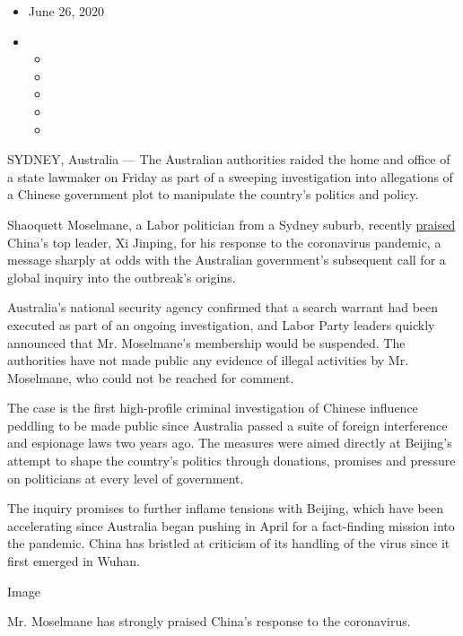 \begin{itemize}
\item
  June 26, 2020
\item
  \begin{itemize}
  \item
  \item
  \item
  \item
  \item
  \end{itemize}
\end{itemize}

SYDNEY, Australia --- The Australian authorities raided the home and
office of a state lawmaker on Friday as part of a sweeping investigation
into allegations of a Chinese government plot to manipulate the
country's politics and policy.

Shaoquett Moselmane, a Labor politician from a Sydney suburb, recently
\href{https://www.smh.com.au/politics/nsw/unswerving-leadership-nsw-labor-mp-praises-china-s-coronavirus-response-20200330-p54fbg.html}{praised}
China's top leader, Xi Jinping, for his response to the coronavirus
pandemic, a message sharply at odds with the Australian government's
subsequent call for a global inquiry into the outbreak's origins.

Australia's national security agency confirmed that a search warrant had
been executed as part of an ongoing investigation, and Labor Party
leaders quickly announced that Mr. Moselmane's membership would be
suspended. The authorities have not made public any evidence of illegal
activities by Mr. Moselmane, who could not be reached for comment.

The case is the first high-profile criminal investigation of Chinese
influence peddling to be made public since Australia passed a suite of
foreign interference and espionage laws two years ago. The measures were
aimed directly at Beijing's attempt to shape the country's politics
through donations, promises and pressure on politicians at every level
of government.

The inquiry promises to further inflame tensions with Beijing, which
have been accelerating since Australia began pushing in April for a
fact-finding mission into the pandemic. China has bristled at criticism
of its handling of the virus since it first emerged in Wuhan.

Image

Mr. Moselmane has strongly praised China's response to the coronavirus.

